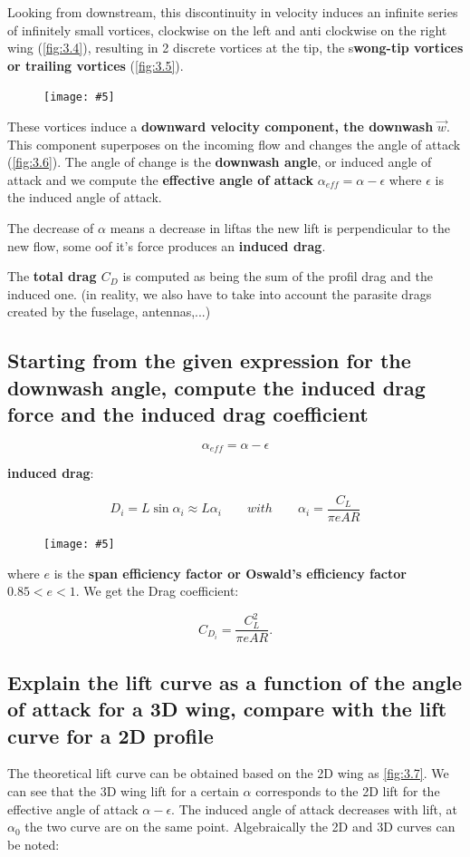 \documentclass[british,french,11pt, a4paper, openany]{article}
\newcommand{\wrapfig}[6]{%
	\begin{figure}%
		\vspace{-5mm}%
		\texttt{[image: \#5]}%
		\captionof{figure}{}%
		\label{#6}%
	\end{figure}%
}
\begin{document}
Looking from downstream, this discontinuity in velocity induces an infinite series of infinitely small vortices, clockwise on the left and anti clockwise on the right wing (\autoref{fig:3.4}), resulting in 2 discrete vortices at the tip, the s\textbf{wong-tip vortices or trailing vortices} (\autoref{fig:3.5}). 

\wrapfig{7}{l}{6.5}{0.08}{ch3/6}{fig:3.6}
These vortices induce a \textbf{downward velocity component, the downwash} $\vec{w}$. This component superposes on the incoming flow and changes the angle of attack (\autoref{fig:3.6}). The angle of change is the \textbf{downwash angle}, or induced angle of attack and we compute the \textbf{effective angle of attack} $\alpha _{eff} = \alpha - \epsilon$ where $\epsilon$ is the induced angle of attack.

The decrease of $\alpha$ means a decrease in liftas the new lift is perpendicular to the new flow, some oof it's force produces an \textbf{induced drag}.

The \textbf{total drag $C_D$} is computed as being the sum of the profil drag and the induced one. (in reality, we also have to take into account the parasite drags created by the fuselage, antennas,...)

\subsection{Starting from the given expression for the downwash angle, compute the induced
	drag force and the induced drag coefficient}

\begin{equation}
\alpha _{eff} = \alpha - \epsilon
\end{equation}

\textbf{induced drag}: 

\begin{equation}
D_i = L \sin \alpha _i \approx L\alpha _i \qquad with \qquad \alpha _i = \frac{C_L}{\pi e AR} 
\label{eq:3.2}
\end{equation}

\wrapfig{10}{r}{5.5}{0.1}{ch3/7}{fig:3.7}
where $e$ is the \textbf{span efficiency factor or Oswald's efficiency factor} $0.85<e<1$. We get the Drag coefficient:

\begin{equation}
C_{D_i} =  \frac{C_L^2}{\pi e AR} .
\end{equation}

\subsection{Explain the lift curve as a function of the angle of attack for a 3D wing, compare
	with the lift curve for a 2D profile}
The theoretical lift curve can be obtained based on the 2D wing as \autoref{fig:3.7}. We can see that the 3D wing lift for a certain $\alpha$ corresponds to the 2D lift for the effective angle of attack $\alpha - \epsilon$. The induced angle of attack decreases with lift, at $\alpha _0$ the two curve are on the same point. Algebraically the 2D and 3D curves can be noted:
\end{document}
